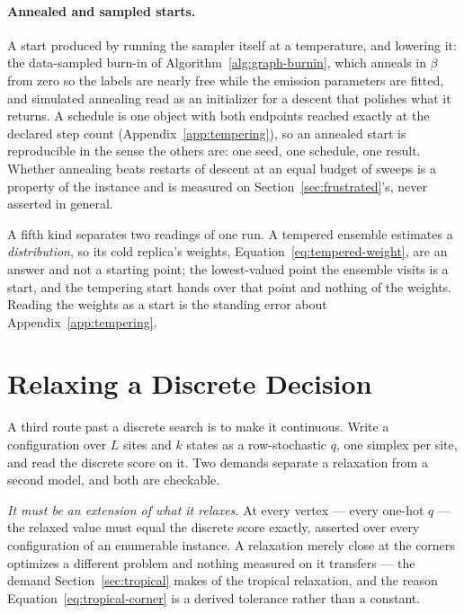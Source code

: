\documentclass[11pt,a4paper]{article}
\begin{document}
\paragraph{Annealed and sampled starts.}
A start produced by running the sampler itself at a temperature, and lowering
it: the data-sampled burn-in of Algorithm~\ref{alg:graph-burnin}, which anneals
in $\beta$ from zero so the labels are nearly free while the emission
parameters are fitted, and simulated annealing read as an initializer for a
descent that polishes what it returns. A schedule is one object with both
endpoints reached exactly at the declared step count
(Appendix~\ref{app:tempering}), so an annealed start is reproducible in the
sense the others are: one seed, one schedule, one result. Whether annealing
beats restarts of descent at an equal budget of sweeps is a property of the
instance and is measured on Section~\ref{sec:frustrated}'s, never asserted in
general.

A fifth kind separates two readings of one run. A tempered ensemble
estimates a \emph{distribution}, so its cold replica's weights,
Equation~\ref{eq:tempered-weight}, are an answer and not a starting point;
the lowest-valued point the ensemble visits is a start, and
the tempering start hands over that point and nothing of the weights.
Reading the weights as a start is the standing error about
Appendix~\ref{app:tempering}.

\section{Relaxing a Discrete Decision}
\label{sec:relaxation}
A third route past a discrete search is to make it continuous. Write a
configuration over $L$ sites and $k$ states as a row-stochastic $q$, one
simplex per site, and read the discrete score on it. Two demands separate a
relaxation from a second model, and both are checkable.

\emph{It must be an extension of what it relaxes.} At every vertex --- every
one-hot $q$ --- the relaxed value must equal the discrete score exactly,
asserted over every configuration of an enumerable instance. A relaxation
merely close at the corners optimizes a different problem and nothing measured
on it transfers --- the demand Section~\ref{sec:tropical} makes of the tropical
relaxation, and the reason Equation~\ref{eq:tropical-corner} is a derived
tolerance rather than a constant.
\end{document}
